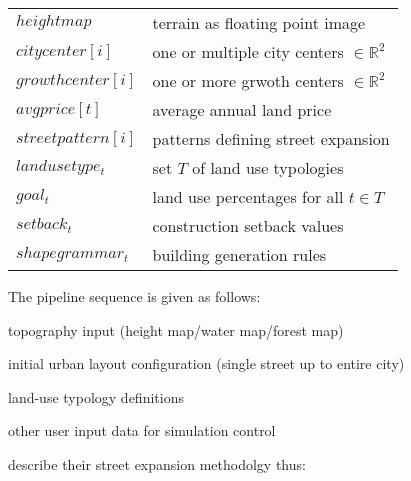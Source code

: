 \documentclass[11pt,twoside]{article}
\numberwithin{equation}{section}
\newcommand{\?}{\stackrel{?}{=}}
\begin{document}
\begin{tabular}{l l}
  $height map$ & terrain as floating point image \\
  $citycenter[i]$ & one or multiple city centers $\in \mathbb{R}^2$ \\
  $growthcenter[i]$ & one or more grwoth centers $\in \mathbb{R}^2$ \\
  $avgprice[t]$ & average annual land price \\
  $street pattern[i]$ & patterns defining street expansion \\
  $land use type_t$ & set $T$ of land use typologies \\
  $goal_t$ & land use percentages for all $t\in T$ \\
  $setback_t$ & construction setback values \\
  $shape grammar_t$ & building generation rules \\            
\end{tabular}

The pipeline sequence is given as follows:
\begin{compactitem}
\item topography input (height map/water map/forest map)
\item initial urban layout configuration (single street up to entire city) 
\item land-use typology definitions 
\item other user input data for simulation control 
\end{compactitem}
\textcite{weber2009interactive} describe their street expansion methodolgy thus:
\end{document}
